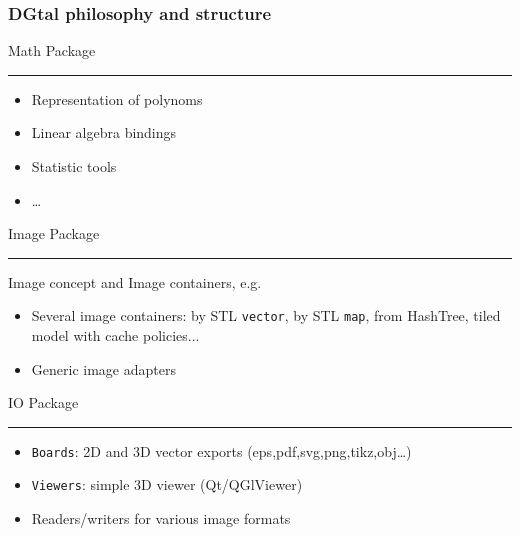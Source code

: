 \documentclass[8pt]{beamer}
\newcommand{\HH}{ \vspace{0.5pt}\hrule}
\begin{document}
\begin{frame}
  \frametitle{DGtal philosophy and structure}

\begin{alertblock}{\centering Math Package\HH}
    \footnotesize
    \begin{itemize}
    \item Representation of polynoms
    \item Linear algebra bindings
    \item Statistic tools
    \item \ldots
    \end{itemize}
  \end{alertblock}
  \begin{alertblock}{\centering Image Package\HH}
    Image concept and Image containers, e.g.
    \begin{itemize}
    \item Several image containers:  by STL \texttt{vector}, by STL
      \texttt{map}, from HashTree, tiled model with cache policies...
    \item Generic image adapters
    \end{itemize}
  \end{alertblock}
  

  \begin{alertblock}{\centering IO Package\HH}
    \small
    \begin{itemize}
    \item \texttt{Boards}: 2D and 3D vector exports
      (eps,pdf,svg,png,tikz,obj\ldots)  
    \item \texttt{Viewers}:  simple 3D viewer (Qt/QGlViewer)
    \item Readers/writers for various image formats
    \end{itemize}
  \end{alertblock}
\end{frame}
\end{document}
